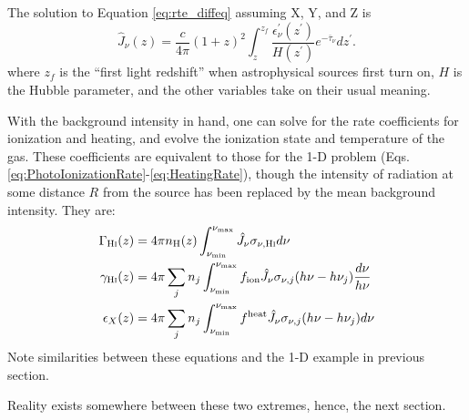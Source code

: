 The solution to Equation \ref{eq:rte_diffeq} {\color{red} assuming X, Y, and Z} is
\begin{equation}
    \hat{J}_{\nu} (z) = \frac{c}{4\pi} (1 + z)^2 \int_{z}^{z_f} \frac{\epsilon_{\nu}^{\prime}(z^{\prime})}{H(z^{\prime})} e^{-\overline{\tau}_{\nu}} dz^{\prime} . \label{eq:AngleAveragedFlux}
\end{equation}    
where $z_f$ is the ``first light redshift'' when astrophysical sources first turn on, $H$ is the Hubble parameter, and the other variables take on their usual meaning. 

With the background intensity in hand, one can solve for the rate coefficients for ionization and heating, and evolve the ionization state and temperature of the gas.  These coefficients are equivalent to those for the 1-D problem (Eqs. \ref{eq:PhotoIonizationRate}-\ref{eq:HeatingRate}), though the intensity of radiation at some distance $R$ from the source has been replaced by the mean background intensity. They are:
\begin{align}
    \Gamma_{\text{H} {\textsc{i}}}(z) & = 4 \pi n_{\text{H}}(z) \int_{\nu_{\min}}^{\nu_{\max}} \hat{J}_{\nu} \sigma_{\nu,\text{H} {\textsc{i}}} d\nu  \\
    \gamma_{\text{H} {\textsc{i}}}(z) & = 4 \pi \sum_j n_j \int_{\nu_{\min}}^{\nu_{\max}} f_{\text{ion}} \hat{J}_{\nu} \sigma_{\nu,j} (h\nu - h\nu_j) \frac{d\nu}{h\nu}  \\
    \epsilon_X(z) & = 4 \pi \sum_j n_j \int_{\nu_{\min}}^{\nu_{\max}} f^{\text{heat}} \hat{J}_{\nu}  \sigma_{\nu,j} (h\nu - h\nu_j) d\nu
\end{align}
{\color{red} Note similarities between these equations and the 1-D example in previous section.}


{\color{red} Reality exists somewhere between these two extremes, hence, the next section.}

